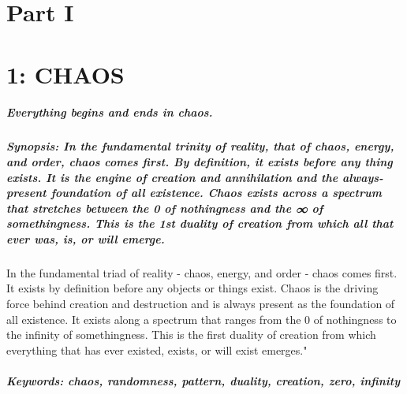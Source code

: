 \documentclass[
]{article}
\author{}
\date{}
\begin{document}
\section{Part I}\label{part-i}

\section{1: CHAOS}\label{1-chaos}

\subparagraph{\texorpdfstring{\textbf{Everything begins and ends in
chaos.}}{Everything begins and ends in chaos.}}\label{everything-begins-and-ends-in-chaos}

\subparagraph{\texorpdfstring{\textbf{Synopsis:} In the fundamental
trinity of reality, that of chaos, energy, and order, chaos comes first.
By definition, it exists before any \emph{thing} exists. It is the
engine of creation and annihilation and the always-present foundation of
all existence. Chaos exists across a spectrum that stretches between the
0 of nothingness and the ∞ of somethingness. This is the 1st duality of
creation from which all that ever was, is, or will emerge.
}{Synopsis: In the fundamental trinity of reality, that of chaos, energy, and order, chaos comes first. By definition, it exists before any thing exists. It is the engine of creation and annihilation and the always-present foundation of all existence. Chaos exists across a spectrum that stretches between the 0 of nothingness and the ∞ of somethingness. This is the 1st duality of creation from which all that ever was, is, or will emerge. }}\label{synopsis-in-the-fundamental-trinity-of-reality-that-of-chaos-energy-and-order-chaos-comes-first--by-definition-it-exists-before-any-thing-exists--it-is-the-engine-of-creation-and-annihilation-and-the-always-present-foundation-of-all-existence--chaos-exists-across-a-spectrum-that-stretches-between-the-0-of-nothingness-and-the--of-somethingness--this-is-the-1st-duality-of-creation-from-which-all-that-ever-was-is-or-will-emerge}

In the fundamental triad of reality - chaos, energy, and order - chaos
comes first. It exists by definition before any objects or things exist.
Chaos is the driving force behind creation and destruction and is always
present as the foundation of all existence. It exists along a spectrum
that ranges from the 0 of nothingness to the infinity of somethingness.
This is the first duality of creation from which everything that has
ever existed, exists, or will exist emerges."

\subparagraph{\texorpdfstring{\textbf{Keywords:} chaos, randomness,
pattern, duality, creation, zero,
infinity}{Keywords: chaos, randomness, pattern, duality, creation, zero, infinity}}\label{keywords-chaos-randomness-pattern-duality-creation-zero-infinity}
\end{document}
